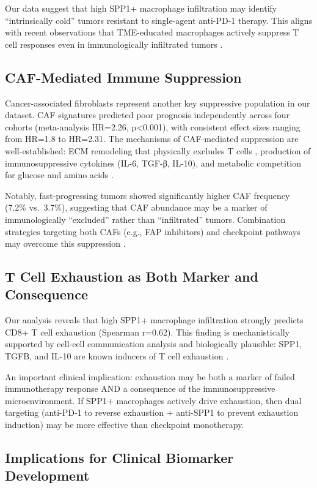 \documentclass[12pt,twoside]{article}
\begin{document}
Our data suggest that high SPP1+ macrophage infiltration may identify ``intrinsically cold'' tumors resistant to single-agent anti-PD-1 therapy. This aligns with recent observations that TME-educated macrophages actively suppress T cell responses even in immunologically infiltrated tumors \cite{Cassetta2019}.

\subsection{CAF-Mediated Immune Suppression}

Cancer-associated fibroblasts represent another key suppressive population in our dataset. CAF signatures predicted poor prognosis independently across four cohorts (meta-analysis HR=2.26, p<0.001), with consistent effect sizes ranging from HR=1.8 to HR=2.31. The mechanisms of CAF-mediated suppression are well-established: ECM remodeling that physically excludes T cells \cite{Elyada2020}, production of immunosuppressive cytokines (IL-6, TGF-β, IL-10), and metabolic competition for glucose and amino acids \cite{Givel2018, Kalluri2016}.

Notably, fast-progressing tumors showed significantly higher CAF frequency (7.2\% vs.\ 3.7\%), suggesting that CAF abundance may be a marker of immunologically ``excluded'' rather than ``infiltrated'' tumors. Combination strategies targeting both CAFs (e.g., FAP inhibitors) and checkpoint pathways may overcome this suppression \cite{Sahai2020}.

\subsection{T Cell Exhaustion as Both Marker and Consequence}

Our analysis reveals that high SPP1+ macrophage infiltration strongly predicts CD8+ T cell exhaustion (Spearman r=0.62). This finding is mechanistically supported by cell-cell communication analysis and biologically plausible: SPP1, TGFB, and IL-10 are known inducers of T cell exhaustion \cite{Thommen2017, Wherry2011}.

An important clinical implication: exhaustion may be both a marker of failed immunotherapy response AND a consequence of the immunosuppressive microenvironment. If SPP1+ macrophages actively drive exhaustion, then dual targeting (anti-PD-1 to reverse exhaustion + anti-SPP1 to prevent exhaustion induction) may be more effective than checkpoint monotherapy.

\subsection{Implications for Clinical Biomarker Development}
\end{document}
